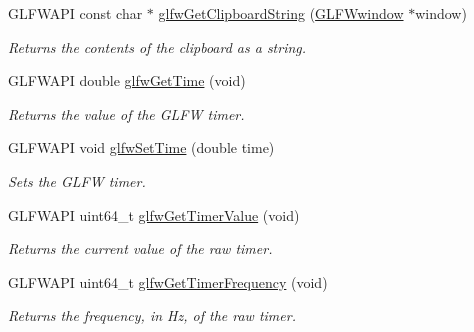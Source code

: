 \begin{DoxyCompactItemize}
G\+L\+F\+W\+A\+PI const char $\ast$ \hyperlink{group__input_ga3ac90c8bbaf0b46063bb02b574f3b6f7}{glfw\+Get\+Clipboard\+String} (\hyperlink{group__window_ga3c96d80d363e67d13a41b5d1821f3242}{G\+L\+F\+Wwindow} $\ast$window)
\begin{DoxyCompactList}\small\item\em Returns the contents of the clipboard as a string. \end{DoxyCompactList}\item 
G\+L\+F\+W\+A\+PI double \hyperlink{group__input_ga03d4a1039b8662c71eeb40beea8cb622}{glfw\+Get\+Time} (void)
\begin{DoxyCompactList}\small\item\em Returns the value of the G\+L\+FW timer. \end{DoxyCompactList}\item 
G\+L\+F\+W\+A\+PI void \hyperlink{group__input_ga94360a3628a09f32708f83cc3fa48590}{glfw\+Set\+Time} (double time)
\begin{DoxyCompactList}\small\item\em Sets the G\+L\+FW timer. \end{DoxyCompactList}\item 
G\+L\+F\+W\+A\+PI uint64\+\_\+t \hyperlink{group__input_gaa00c3e32227eb70b3968fca0bfe4ae26}{glfw\+Get\+Timer\+Value} (void)
\begin{DoxyCompactList}\small\item\em Returns the current value of the raw timer. \end{DoxyCompactList}\item 
G\+L\+F\+W\+A\+PI uint64\+\_\+t \hyperlink{group__input_gaa92d10b10013372778efbf6367714371}{glfw\+Get\+Timer\+Frequency} (void)
\begin{DoxyCompactList}\small\item\em Returns the frequency, in Hz, of the raw timer. \end{DoxyCompactList}\end{DoxyCompactItemize}
